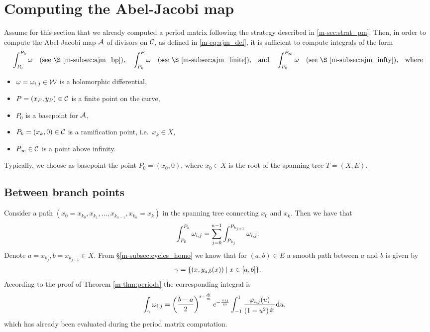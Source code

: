 \documentclass[main.tex]{subfiles}
\begin{document}
  \section{Computing the Abel-Jacobi map}\label{sec:comp_ajm}

   Assume for this section that we already computed a period matrix following the strategy described in \ref{m-sec:strat_pm}.
   Then, in order to compute the Abel-Jacobi map  $\mathcal{A}$ of divisors on $\mathcal{C}$, as defined in \eqref{m-eq:ajm_def}, it is sufficient to compute integrals of the form
  \begin{align*}
    \int_{P_0}^{P_k} \w\quad \text{(see \S \ref{m-subsec:ajm_bp}),} \quad
    \int_{P_k}^{P} \w \quad \text{(see \S \ref{m-subsec:ajm_finite}),}
    \quad \text{and} \quad \int_{P_0}^{P_{\infty}} \w\quad \text{(see \S \ref{m-subsec:ajm_infty}),} \quad \text{where}
  \end{align*}

  \begin{itemize}
   \item $\omega = \omega_{i,j}\in \mathcal{W}$ is a holomorphic differential,
   \item $P = (x_P,y_P) \in \mathcal{C}$ is a finite point on the curve,
   \item $P_0$ is a basepoint for $\mathcal{A}$,
   \item $P_k = (x_k,0) \in \mathcal{C}$ is a ramification point, i.e.\ $x_k \in X$,
   \item $P_{\infty} \in \mathcal{C}$ is a point above infinity.
  \end{itemize}

  Typically, we choose as basepoint the point $P_0 = (x_0,0)$, where $x_0 \in X$ is the root of the spanning tree $T = (X,E)$.

  \subsection{Between branch points}\label{subsec:ajm_bp}

  Consider a path $(x_0=x_{k_0},x_{k_1},\dots,x_{k_{n-1}},x_{k_n}=x_k)$ in the spanning tree connecting $x_0$ and $x_k$. Then we have that
  \begin{align}
    \int_{P_0}^{P_k} \omega_{i,j} = \sum_{j = 0}^{n-1}  \int_{P_{k_j}}^{P_{k_{j+1}}} \omega_{i,j}.
  \end{align}
  Denote $a = x_{k_j}, b = x_{k_{j+1}} \in X$. From \S \ref{m-subsec:cycles_homo} we know that for $(a,b) \in E$ a smooth path between $a$ and $b$ is given by
  \begin{align*}
   \gamma = \{  (x,y_{a,b}(x))  \mid  x \in [a,b]  \}.
  \end{align*}
  According to the proof of Theorem \ref{m-thm:periods} the corresponding integral is
  \begin{align}
   \int_{\gamma} \omega_{i,j}  & =  \left(\frac{b-a}{2}\right)^{i-\frac{dj}{m}} e^{-\frac{\pi i j}{m}}  \int_{-1}^1 \frac{\varphi_{i,j}(u)}{(1-u^2)^{\frac{j}{m}}} \mathrm d u ,
  \end{align}
  which has already been evaluated during the period matrix computation.
\end{document}
